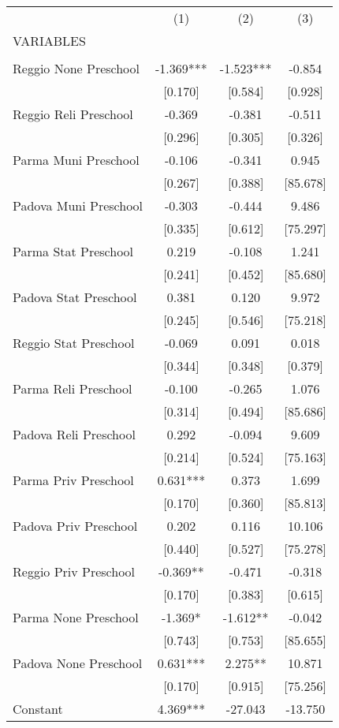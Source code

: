 \begin{tabular}{lccc} \hline
 & (1) & (2) & (3) \\
VARIABLES &  &  &  \\ \hline
 &  &  &  \\
Reggio None Preschool & -1.369*** & -1.523*** & -0.854 \\
 & [0.170] & [0.584] & [0.928] \\
Reggio Reli Preschool & -0.369 & -0.381 & -0.511 \\
 & [0.296] & [0.305] & [0.326] \\
Parma Muni Preschool & -0.106 & -0.341 & 0.945 \\
 & [0.267] & [0.388] & [85.678] \\
Padova Muni Preschool & -0.303 & -0.444 & 9.486 \\
 & [0.335] & [0.612] & [75.297] \\
Parma Stat Preschool & 0.219 & -0.108 & 1.241 \\
 & [0.241] & [0.452] & [85.680] \\
Padova Stat Preschool & 0.381 & 0.120 & 9.972 \\
 & [0.245] & [0.546] & [75.218] \\
Reggio Stat Preschool & -0.069 & 0.091 & 0.018 \\
 & [0.344] & [0.348] & [0.379] \\
Parma Reli Preschool & -0.100 & -0.265 & 1.076 \\
 & [0.314] & [0.494] & [85.686] \\
Padova Reli Preschool & 0.292 & -0.094 & 9.609 \\
 & [0.214] & [0.524] & [75.163] \\
Parma Priv Preschool & 0.631*** & 0.373 & 1.699 \\
 & [0.170] & [0.360] & [85.813] \\
Padova Priv Preschool & 0.202 & 0.116 & 10.106 \\
 & [0.440] & [0.527] & [75.278] \\
Reggio Priv Preschool & -0.369** & -0.471 & -0.318 \\
 & [0.170] & [0.383] & [0.615] \\
Parma None Preschool & -1.369* & -1.612** & -0.042 \\
 & [0.743] & [0.753] & [85.655] \\
Padova None Preschool & 0.631*** & 2.275** & 10.871 \\
 & [0.170] & [0.915] & [75.256] \\
Constant & 4.369*** & -27.043 & -13.750 \\

\end{tabular}

